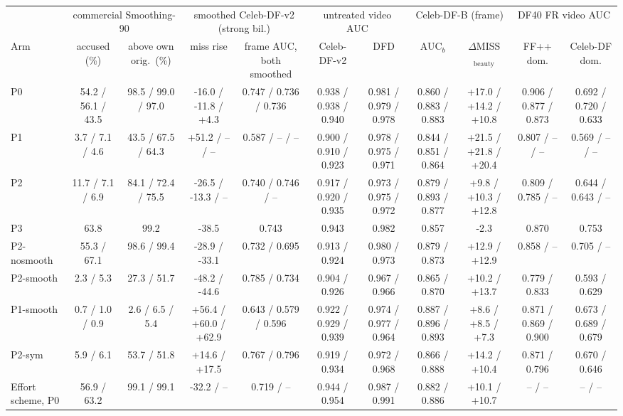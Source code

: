 \begin{tabular}{@{}l cc cc cc cc cc@{}}
\toprule
 & \multicolumn{2}{c}{commercial Smoothing-90} & \multicolumn{2}{c}{smoothed Celeb-DF-v2 (strong bil.)} & \multicolumn{2}{c}{untreated video AUC} & \multicolumn{2}{c}{Celeb-DF-B (frame)} & \multicolumn{2}{c}{DF40 FR video AUC} \\
\cmidrule(lr){2-3}\cmidrule(lr){4-5}\cmidrule(lr){6-7}\cmidrule(lr){8-9}\cmidrule(lr){10-11}
Arm & accused (\%) & above own orig.\ (\%) & miss rise & frame AUC, both smoothed & Celeb-DF-v2 & DFD & AUC$_b$ & $\Delta$MISS$_\text{beauty}$ & FF++ dom. & Celeb-DF dom. \\
\midrule
P0 & 54.2 / 56.1 / 43.5 & 98.5 / 99.0 / 97.0 & -16.0 / -11.8 / +4.3 & 0.747 / 0.736 / 0.736 & 0.938 / 0.938 / 0.940 & 0.981 / 0.979 / 0.978 & 0.860 / 0.883 / 0.883 & +17.0 / +14.2 / +10.8 & 0.906 / 0.877 / 0.873 & 0.692 / 0.720 / 0.633 \\
P1 & 3.7 / 7.1 / 4.6 & 43.5 / 67.5 / 64.3 & +51.2 / -- / -- & 0.587 / -- / -- & 0.900 / 0.910 / 0.923 & 0.978 / 0.975 / 0.971 & 0.844 / 0.851 / 0.864 & +21.5 / +21.8 / +20.4 & 0.807 / -- / -- & 0.569 / -- / -- \\
P2 & 11.7 / 7.1 / 6.9 & 84.1 / 72.4 / 75.5 & -26.5 / -13.3 / -- & 0.740 / 0.746 / -- & 0.917 / 0.920 / 0.935 & 0.973 / 0.975 / 0.972 & 0.879 / 0.893 / 0.877 & +9.8 / +10.3 / +12.8 & 0.809 / 0.785 / -- & 0.644 / 0.643 / -- \\
P3 & 63.8 & 99.2 & -38.5 & 0.743 & 0.943 & 0.982 & 0.857 & -2.3 & 0.870 & 0.753 \\
P2-nosmooth & 55.3 / 67.1 & 98.6 / 99.4 & -28.9 / -33.1 & 0.732 / 0.695 & 0.913 / 0.924 & 0.980 / 0.973 & 0.879 / 0.873 & +12.9 / +12.9 & 0.858 / -- & 0.705 / -- \\
P2-smooth & 2.3 / 5.3 & 27.3 / 51.7 & -48.2 / -44.6 & 0.785 / 0.734 & 0.904 / 0.926 & 0.967 / 0.966 & 0.865 / 0.870 & +10.2 / +13.7 & 0.779 / 0.833 & 0.593 / 0.629 \\
P1-smooth & 0.7 / 1.0 / 0.9 & 2.6 / 6.5 / 5.4 & +56.4 / +60.0 / +62.9 & 0.643 / 0.579 / 0.596 & 0.922 / 0.929 / 0.939 & 0.974 / 0.977 / 0.964 & 0.887 / 0.896 / 0.893 & +8.6 / +8.5 / +7.3 & 0.871 / 0.869 / 0.900 & 0.673 / 0.689 / 0.679 \\
P2-sym & 5.9 / 6.1 & 53.7 / 51.8 & +14.6 / +17.5 & 0.767 / 0.796 & 0.919 / 0.934 & 0.972 / 0.968 & 0.866 / 0.888 & +14.2 / +10.4 & 0.871 / 0.796 & 0.670 / 0.646 \\
Effort scheme, P0 & 56.9 / 63.2 & 99.1 / 99.1 & -32.2 / -- & 0.719 / -- & 0.944 / 0.954 & 0.987 / 0.991 & 0.882 / 0.886 & +10.1 / +10.7 & -- / -- & -- / -- \\

\end{tabular}
